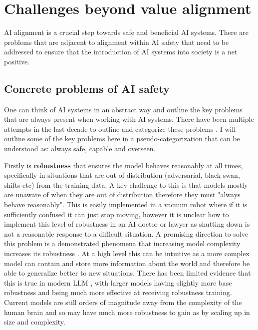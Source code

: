 \section{Challenges beyond value alignment}
\label{sec:challenges}

AI alignment is a crucial step towards safe and beneficial AI systems. There are problems that are adjacent to alignment within AI safety that need to be addressed to ensure that the introduction of AI systems into society is a net positive.

\subsection{Concrete problems of AI safety}

One can think of AI systems in an abstract way and outline the key problems that are always present when working with AI systems. There have been multiple attempts in the last decade to outline and categorize these problems \cite{amodeiConcreteProblemsAI2016a,hendrycksUnsolvedProblemsML2022}. I will outline some of the key problems here in a pseudo-categorization that can be understood as: always safe, capable and overseen.

Firstly is \textbf{robustness} that ensures the model behaves reasonably at all times, specifically in situations that are out of distribution (adversarial, black swan, shifts etc) from the training data. A key challenge to this is that models mostly are unaware of when they are out of distribution therefore they must "always behave reasonably". This is easily implemented in a vacuum robot where if it is sufficiently confused it can just stop moving, however it is unclear how to implement this level of robustness in an AI doctor or lawyer as shutting down is not a reasonable response to a difficult situation. A promising direction to solve this problem is a demonstrated phenomena that  increasing model complexity increases its robustness \cite{bubeckUniversalLawRobustness2022}. At a high level this can be intuitive as a more complex model can contain and store more information about the world and therefore be able to generalize better to new situations. There has been limited evidence that this is true in modern LLM \cite{howe2025scaling}, with larger models having slightly more base robustness and being much more effective at receiving robustness training. Current models are still orders of magnitude away from the complexity of the human brain \cite{sandbergWholeBrainEmulation2008} and so may have much more  robustness to gain as by scaling up in size and complexity.

